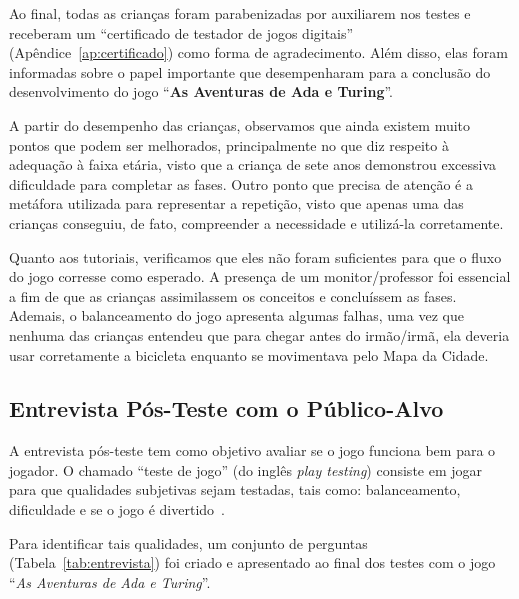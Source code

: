 Ao final, todas as crianças foram parabenizadas por auxiliarem nos testes e receberam um “certificado de testador de jogos digitais” (Apêndice~\ref{ap:certificado}) como forma de agradecimento. Além disso, elas foram informadas sobre o papel importante que desempenharam para a conclusão do desenvolvimento do jogo “\textbf{As Aventuras de Ada e Turing}”.

A partir do desempenho das crianças, observamos que ainda existem muito pontos que podem ser melhorados, principalmente no que diz respeito à adequação à faixa etária, visto que a criança de sete anos demonstrou excessiva dificuldade para completar as fases. Outro ponto que precisa de atenção é a metáfora utilizada para representar a repetição, visto que apenas uma das crianças conseguiu, de fato, compreender a necessidade e utilizá-la corretamente.

Quanto aos tutoriais, verificamos que eles não foram suficientes para que o fluxo do jogo corresse como esperado. A presença de um monitor/professor foi essencial a fim de que as crianças assimilassem os conceitos e concluíssem as fases. Ademais, o balanceamento do jogo apresenta algumas falhas, uma vez que nenhuma das crianças entendeu que para chegar antes do irmão/irmã, ela deveria usar corretamente a bicicleta enquanto se movimentava pelo Mapa da Cidade.

\subsection{Entrevista Pós-Teste com o Público-Alvo} \label{ssec:entrevista}

A entrevista pós-teste tem como objetivo avaliar se o jogo funciona bem para o jogador. O chamado “teste de jogo” (do inglês \textit{play testing}) consiste em jogar para que qualidades subjetivas sejam testadas, tais como: balanceamento, dificuldade e se o jogo é divertido~\cite{schultz2005game}.

Para identificar tais qualidades, um conjunto de perguntas (Tabela~\ref{tab:entrevista}) foi criado e apresentado ao final dos testes com o jogo “\textit{As Aventuras de Ada e Turing}”.

